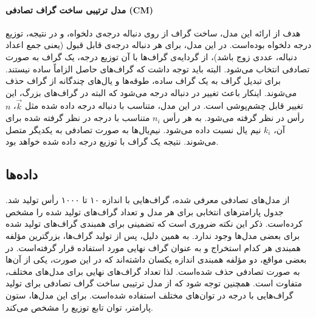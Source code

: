 \paragraph{مدل ترتیبی ساخت گراف تصادفی (CM)}
هدف از ارائه این مدل، ساخت گراف از روی دنباله درجه‌ی دلخواه، و در نتیجه، توزیع درجه دلخواه بوده‌است. در این مدل، برای هر دنباله درجه‌ی قابل قبول (یعنی جمع اعداد دنباله، عددی زوج باشد)، از گردایه‌ی گراف‌ها با آن توزیع درجه، یک گراف به صورت تصادفی انتخاب می‌شود. البته باید توجه داشت که گراف‌های حاصل الزاماً ساده نیستند. برای تبدیل گراف به یک گراف ساده، طوقه‌ها و یال‌های چندگانه از گراف حذف می‌شوند. اینکار باعث تغییر در دنباله درجه می‌شود که البته در گراف‌های بزرگ، این تغییر قابل چشم‌پوشی است. در این مدل، متناسب با دنباله درجه داده شده مثل $\vec{k}$، $n$ رأس در نظر گرفته می‌شود. به هر رأس $n_i$ متناسب با درجه در نظر گرفته شده برای آن، $k_i$ نیم یال نسبت داده می‌شود. نیم‌یال‌ها به صورت تصادفی به یکدیگر متصل می‌شوند. نتیجه یک گراف با توزیع درجه داده‌ شده خواهد بود.

\subsection{داده‌‌ها}
از مدل‌های تصادفی معرفی شده، گراف‌هایی با اندازه ۱۰ تا ۱۰۰۰ رأس تولید شد. جدول  پارامترهای انتخابی برای هر مدل و تعداد گراف‌های تولید شده را مشخص کرده‌است. ذکر این نکته ضروری است که تضمینی برای همبندی گراف‌های تولید شده برای بعضی مدل‌ها وجود ندارد. به همین دلیل، پس از تولید گراف‌ها، بزرگترین مؤلفه همبندی هر کدام استخراج و به عنوان گراف نهایی مورد استفاده قرار گرفته‌است. در بعضی مواقع، دو مؤلفه همبندی اندازه یکسان داشته‌اند که در این صورت، یکی از آن‌ها به صورت تصادفی حذف شده‌است. لذا تعداد گراف‌های نهایی برای مدل‌های مختلف، متفاوت است. همچنین توجه شود که از مدل ترتیبی ساخت گراف تصادفی برای تولید گراف‌هایی با  درجه در توان‌های مختلف استفاده شده‌است. برای این مدل‌ها، ستون پارامتر، توان تابع توزیع را مشخص می‌کند.

